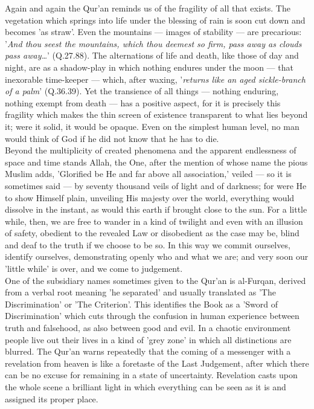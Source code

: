 \documentclass[10pt, twoside]{book}
\begin{document}
Again and again the Qur'an reminds us of the fragility of all that exists. The vegetation which 
springs into life under the blessing of rain is soon cut down and becomes 'as straw'. Even the 
mountains --- images of stability --- are precarious: '\emph{And thou seest the mountains, which thou deemest so firm, pass away as clouds pass away\ldots{}}' (Q.27.88). The alternations of life and death, like those of day and night, are as a shadow\hyp{}play in which nothing endures under the moon --- that inexorable time-keeper --- which, after waxing, '\emph{returns like an aged sickle\hyp{}branch of a palm}' (Q.36.39). Yet the transience of all things --- nothing enduring, nothing exempt from death --- has a positive aspect, for it is precisely this fragility which makes the thin screen of existence transparent to what lies beyond it; were it solid, it would be opaque. Even on the simplest human level, no man would think of God if he did not know that he has to die. \\

Beyond the multiplicity of created phenomena and the apparent endlessness of space and time stands 
Allah, the One, after the mention of whose name the pious Muslim adds, 'Glorified be He and far above 
all association,' veiled --- so it is sometimes said --- by seventy thousand veils of light and of 
darkness; for were He to show Himself plain, unveiling His majesty over the world, everything would 
dissolve in the instant, as would this earth if brought close to the sun. For a little while, then, 
we are free to wander in a kind of twilight and even with an illusion of safety, obedient to the 
revealed Law or disobedient as the case may be, blind and deaf to the truth if we choose to be so. In 
this way we commit ourselves, identify ourselves, demonstrating openly who and what we are; and very 
soon our 'little while' is over, and we come to judgement. \\

One of the subsidiary names sometimes given to the Qur'an is al\hyp{}Furqan, derived from a verbal root 
meaning 'he separated' and usually translated as 'The Discrimination' or 'The Criterion'. This 
identifies the Book as a 'Sword of Discrimination' which cuts through the confusion in human 
experience between truth and falsehood, as also between good and evil. In a chaotic environment 
people live out their lives in a kind of 'grey zone' in which all distinctions are blurred. The 
Qur'an warns repeatedly that the coming of a messenger with a revelation from heaven is like a 
foretaste of the Last Judgement, after which there can be no excuse for remaining in a state of 
uncertainty. Revelation casts upon the whole scene a brilliant light in which everything can be seen 
as it is and assigned its proper place. \\
\end{document}
